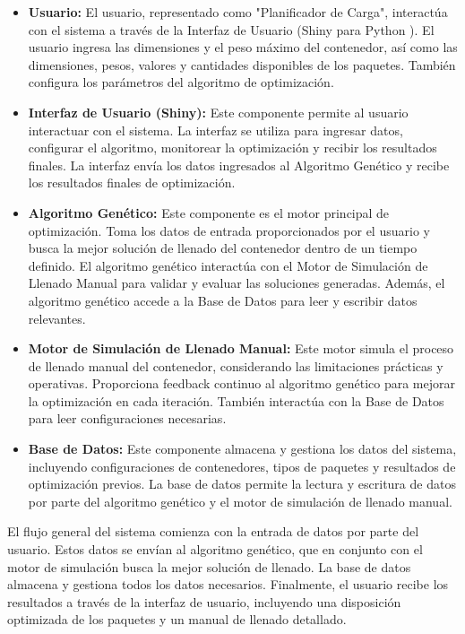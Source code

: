 \documentclass[9pt,a4paper]{rho}
\begin{document}
\begin{itemize}[itemsep=.5em]
    \item \textbf{Usuario:} El usuario, representado como "Planificador de Carga", interactúa con el sistema a través de la Interfaz de Usuario (Shiny para Python \cite{shiny_intro}). El usuario ingresa las dimensiones y el peso máximo del contenedor, así como las dimensiones, pesos, valores y cantidades disponibles de los paquetes. También configura los parámetros del algoritmo de optimización.
    \item \textbf{Interfaz de Usuario (Shiny):} Este componente permite al usuario interactuar con el sistema. La interfaz se utiliza para ingresar datos, configurar el algoritmo, monitorear la optimización y recibir los resultados finales. La interfaz envía los datos ingresados al Algoritmo Genético y recibe los resultados finales de optimización.
    \item \textbf{Algoritmo Genético:} Este componente es el motor principal de optimización. Toma los datos de entrada proporcionados por el usuario y busca la mejor solución de llenado del contenedor dentro de un tiempo definido. El algoritmo genético interactúa con el Motor de Simulación de Llenado Manual para validar y evaluar las soluciones generadas. Además, el algoritmo genético accede a la Base de Datos para leer y escribir datos relevantes.
    \item \textbf{Motor de Simulación de Llenado Manual:} Este motor simula el proceso de llenado manual del contenedor, considerando las limitaciones prácticas y operativas. Proporciona feedback continuo al algoritmo genético para mejorar la optimización en cada iteración. También interactúa con la Base de Datos para leer configuraciones necesarias.
    \item \textbf{Base de Datos:} Este componente almacena y gestiona los datos del sistema, incluyendo configuraciones de contenedores, tipos de paquetes y resultados de optimización previos. La base de datos permite la lectura y escritura de datos por parte del algoritmo genético y el motor de simulación de llenado manual.
\end{itemize}

El flujo general del sistema comienza con la entrada de datos por parte del usuario. Estos datos se envían al algoritmo genético, que en conjunto con el motor de simulación busca la mejor solución de llenado. La base de datos almacena y gestiona todos los datos necesarios. Finalmente, el usuario recibe los resultados a través de la interfaz de usuario, incluyendo una disposición optimizada de los paquetes y un manual de llenado detallado.
\end{document}
